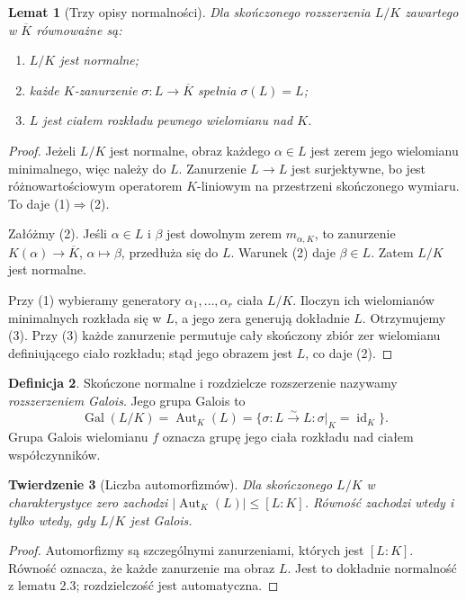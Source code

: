 \documentclass[11pt,a4paper,oneside]{book}
\numberwithin{equation}{section}
\theoremstyle{plain}
\newtheorem{twierdzenie}{Twierdzenie}[chapter]
\newtheorem{lemat}[twierdzenie]{Lemat}
\theoremstyle{definition}
\newtheorem{definicja}[twierdzenie]{Definicja}
\theoremstyle{remark}
\newcommand{\Gal}{\operatorname{Gal}}
\newcommand{\Aut}{\operatorname{Aut}}
\newcommand{\id}{\operatorname{id}}
\begin{document}
\begin{lemat}[Trzy opisy normalności]
Dla skończonego rozszerzenia $L/K$ zawartego w $\overline K$ równoważne są:
\begin{enumerate}
\item $L/K$ jest normalne;
\item każde $K$-zanurzenie $\sigma:L\to\overline K$ spełnia $\sigma(L)=L$;
\item $L$ jest ciałem rozkładu pewnego wielomianu nad $K$.
\end{enumerate}
\end{lemat}
\begin{proof}
Jeżeli $L/K$ jest normalne, obraz każdego $\alpha\in L$ jest zerem jego wielomianu minimalnego, więc należy do $L$. Zanurzenie $L\to L$ jest surjektywne, bo jest różnowartościowym operatorem $K$-liniowym na przestrzeni skończonego wymiaru. To daje (1)$\Rightarrow$(2).

Załóżmy (2). Jeśli $\alpha\in L$ i $\beta$ jest dowolnym zerem $m_{\alpha,K}$, to zanurzenie $K(\alpha)\to\overline K$, $\alpha\mapsto\beta$, przedłuża się do $L$. Warunek (2) daje $\beta\in L$. Zatem $L/K$ jest normalne.

Przy (1) wybieramy generatory $\alpha_1,\dots,\alpha_r$ ciała $L/K$. Iloczyn ich wielomianów minimalnych rozkłada się w $L$, a jego zera generują dokładnie $L$. Otrzymujemy (3). Przy (3) każde zanurzenie permutuje cały skończony zbiór zer wielomianu definiującego ciało rozkładu; stąd jego obrazem jest $L$, co daje (2).
\end{proof}

\begin{definicja}
Skończone normalne i rozdzielcze rozszerzenie nazywamy \emph{rozszerzeniem Galois}. Jego grupa Galois to
\[
\Gal(L/K)=\Aut_K(L)=\{\sigma:L\xrightarrow{\sim}L:\sigma|_K=\id_K\}.
\]
Grupa Galois wielomianu $f$ oznacza grupę jego ciała rozkładu nad ciałem współczynników.
\end{definicja}

\begin{twierdzenie}[Liczba automorfizmów]
Dla skończonego $L/K$ w charakterystyce zero zachodzi $|\Aut_K(L)|\le[L:K]$. Równość zachodzi wtedy i tylko wtedy, gdy $L/K$ jest Galois.
\end{twierdzenie}
\begin{proof}
Automorfizmy są szczególnymi zanurzeniami, których jest $[L:K]$. Równość oznacza, że każde zanurzenie ma obraz $L$. Jest to dokładnie normalność z lematu 2.3; rozdzielczość jest automatyczna.
\end{proof}
\end{document}
